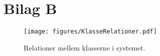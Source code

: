 \chapter{Bilag B} \label{chap:klasseRel}

\begin{figure}[H] 
	\texttt{[image: figures/KlasseRelationer.pdf]} 
	\caption{Relationer mellem klasserne i systemet.}
	\label{fig:} 
\end{figure} 